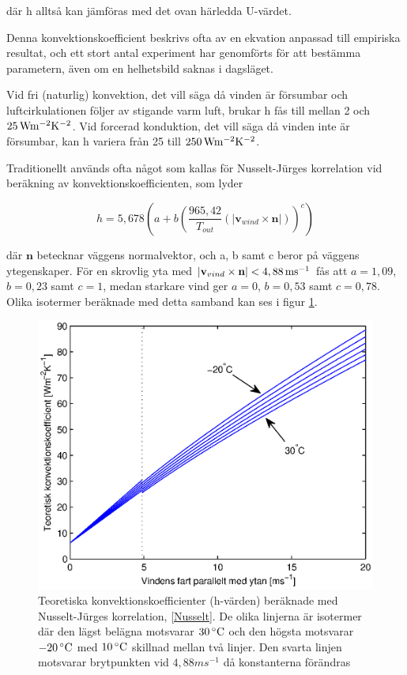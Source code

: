 där h alltså kan jämföras med det ovan härledda U-värdet. 

Denna konvektionskoefficient beskrivs ofta av en ekvation anpassad till empiriska resultat, och ett stort antal experiment har genomförts för att bestämma parametern, även om en helhetsbild saknas i dagsläget.

Vid fri (naturlig) konvektion, det vill säga då vinden är försumbar och luftcirkulationen följer av stigande varm luft, brukar h fås till mellan 2 och $\unit[25]{Wm^{-2}K^{-2}}$. Vid forcerad konduktion, det vill säga då vinden inte är försumbar, kan h variera från 25 till $\unit[250]{Wm^{-2}K^{-2}}$. \cite{ASHRAE09}

Traditionellt används ofta något som kallas för Nusselt-Jürges korrelation vid beräkning av konvektionskoefficienten, som lyder

\begin{equation}\label{Nusselt}
h = 5,678 \left( a + b \left( \frac{965,42}{T_{out}}\left(|\mathbf{v}_{wind}\times \mathbf{n}|\right) \right)^c \right)
\end{equation}

där $\mathbf{n}$ betecknar väggens normalvektor, och a, b samt c beror på väggens ytegenskaper. För en skrovlig yta med $|\mathbf{v}_{vind}\times \mathbf{n}| < \unit[4,88]{ms^{-1}}$ fås att $a=1,09$, $b=0,23$ samt $c=1$, medan starkare vind ger $a=0$, $b=0,53$ samt $c=0,78$. Olika isotermer beräknade med detta samband kan ses i figur \ref{hvalues}.

\begin{figure}[hpbt]
\label{hvalues}\centering
\includegraphics[scale=0.7]{images/hvalues.eps}
\caption{Teoretiska konvektionskoefficienter (h-värden) beräknade med Nusselt-Jürges korrelation, \eqref{Nusselt}. De olika linjerna är isotermer där den lägst belägna motsvarar $\unit[30]{^{\circ}C}$ och den högsta motsvarar $\unit[-20]{^{\circ}C}$ med $\unit[10]{^{\circ}C}$ skillnad mellan två linjer. Den svarta linjen motsvarar brytpunkten vid $\unit{4,88}{m s^{-1}}$ då konstanterna förändras}
\end{figure}

